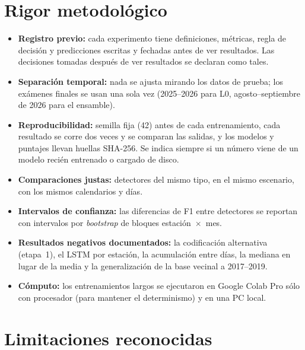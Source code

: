 \documentclass[11pt, letterpaper]{article}
\begin{document}
\section{Rigor metodológico}

\begin{itemize}
  \item \textbf{Registro previo:} cada experimento tiene definiciones, métricas, regla de
    decisión y predicciones escritas y fechadas antes de ver resultados. Las decisiones
    tomadas después de ver resultados se declaran como tales.
  \item \textbf{Separación temporal:} nada se ajusta mirando los datos de prueba; los
    exámenes finales se usan una sola vez (2025--2026 para L0, agosto--septiembre de 2026
    para el ensamble).
  \item \textbf{Reproducibilidad:} semilla fija (42) antes de cada entrenamiento, cada
    resultado se corre dos veces y se comparan las salidas, y los modelos y puntajes
    llevan huellas SHA-256. Se indica siempre si un número viene de un modelo recién
    entrenado o cargado de disco.
  \item \textbf{Comparaciones justas:} detectores del mismo tipo, en el mismo escenario,
    con los mismos calendarios y días.
  \item \textbf{Intervalos de confianza:} las diferencias de F1 entre detectores se
    reportan con intervalos por \emph{bootstrap} de bloques estación~$\times$~mes.
  \item \textbf{Resultados negativos documentados:} la codificación alternativa (etapa~1),
    el LSTM por estación, la acumulación entre días, la mediana en lugar de la media y la
    generalización de la base vecinal a 2017--2019.
  \item \textbf{Cómputo:} los entrenamientos largos se ejecutaron en Google Colab Pro sólo
    con procesador (para mantener el determinismo) y en una PC local.
\end{itemize}

\section{Limitaciones reconocidas}
\end{document}
